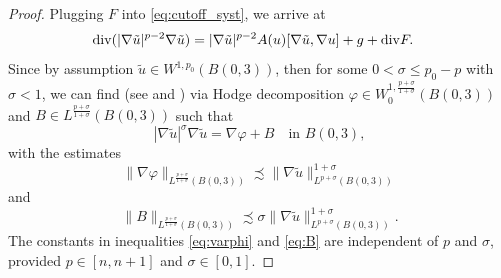 \documentclass[12pt]{amsart}
\renewcommand{\div}{{\rm div}}
\numberwithin{theorem}{section} \numberwithin{equation}{section}
\newcommand{\aleq}{\precsim}
\begin{document}
\begin{proof}
Plugging $F$ into \eqref{eq:cutoff_syst}, we arrive at
\begin{equation} \label{eq:pharm2}
\begin{split}
 \div(|\nabla \tilde{u}|^{p-2} \nabla \tilde{u})& = |\nabla \tilde{u}|^{p-2} A(u)[\nabla \tilde{u},\nabla u] + g + \div F.
 \end{split}
\end{equation} 
Since by assumption $\tilde{u} \in W^{1,p_0}(B(0,3))$, then for some $0<\sigma \le p_0-p$ with $\sigma<1$, we can find (see \cite[Theorem 8.1]{Iwaniec} and \cite[Theorem 4]{Iwaniec-Sbordone}) via Hodge decomposition $\varphi \in W^{1,\frac{p+\sigma}{1+\sigma}}_0(B(0,3))$ and $B \in L^{\frac{p+\sigma}{1+\sigma}}(B(0,3))$ such that
\[
 |\nabla \tilde{u}|^{\sigma} \nabla \tilde{u} = \nabla \varphi + B \quad \text{in $B(0,3)$},
\]
with the estimates
\begin{equation} \label{eq:varphi}
 \|\nabla \varphi\|_{L^{\frac{p+\sigma}{1+\sigma}}(B(0,3))} \aleq \|\nabla \tilde{u}\|_{L^{p+\sigma}(B(0,3))}^{1+\sigma}
\end{equation} 
and 
\begin{equation} \label{eq:B}
 \|B\|_{L^{\frac{p+\sigma}{1+\sigma}}(B(0,3))} \aleq \sigma \|\nabla \tilde{u}\|_{L^{p+\sigma}(B(0,3))}^{1+\sigma}.
\end{equation}
The constants in inequalities \eqref{eq:varphi} and \eqref{eq:B} are independent of $p$ and $\sigma$, provided $p\in [n,n+1]$ and $\sigma\in[0,1]$. 


\end{proof}
\end{document}
